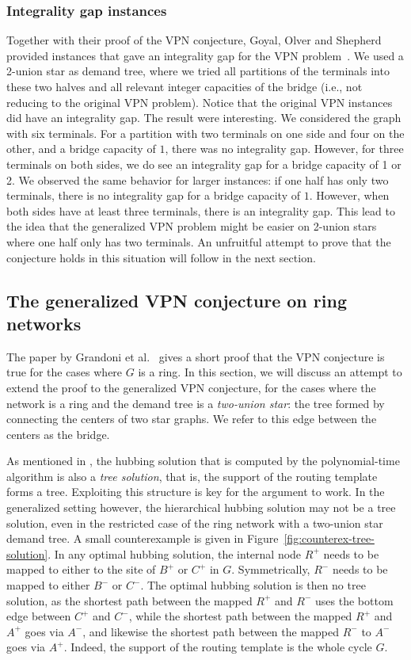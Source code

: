 \subsubsection{Integrality gap instances}
Together with their proof of the VPN conjecture, Goyal, Olver and Shepherd provided instances that gave an integrality gap for the VPN problem~\cite{goyal2013vpn}.
We used a 2-union star as demand tree, where we tried all partitions of the terminals into these two halves and all relevant integer capacities of the bridge (i.e., not reducing to the original VPN problem).
Notice that the original VPN instances did have an integrality gap.
The result were interesting.
We considered the graph with six terminals.
For a partition with two terminals on one side and four on the other, and a bridge capacity of $1$, there was no integrality gap.
However, for three terminals on both sides, we do see an integrality gap for a bridge capacity of 1 or 2.
We observed the same behavior for larger instances: if one half has only two terminals, there is no integrality gap for a bridge capacity of $1$.
However, when both sides have at least three terminals, there is an integrality gap.
This lead to the idea that the generalized VPN problem might be easier on 2-union stars where one half only has two terminals.
An unfruitful attempt to prove that the conjecture holds in this situation will follow in the next section.

\subsection{The generalized VPN conjecture on ring networks} \label{subsec:genvpn:rings}
The paper by Grandoni et al.~\cite{grandoni2008short} gives a short proof that the VPN conjecture is true for the cases where $G$ is a ring.
In this section, we will discuss an attempt to extend the proof to the generalized VPN conjecture, for the cases where the network is a ring and the demand tree is a \emph{two-union star}: the tree formed by connecting the centers of two star graphs.
We refer to this edge between the centers as the bridge.

As mentioned in \cite{grandoni2008short}, the hubbing solution that is computed by the polynomial-time algorithm is also a \emph{tree solution}, that is, the support of the routing template forms a tree.
Exploiting this structure is key for the argument to work.
In the generalized setting however, the hierarchical hubbing solution may not be a tree solution, even in the restricted case of the ring network with a two-union star demand tree.
A small counterexample is given in Figure~\ref{fig:counterex-tree-solution}.
In any optimal hubbing solution, the internal node $R^+$ needs to be mapped to either to the site of $B^+$ or $C^+$ in $G$.
Symmetrically, $R^-$ needs to be mapped to either $B^-$ or $C^-$.
The optimal hubbing solution is then no tree solution, as the shortest path between the mapped $R^+$ and $R^-$ uses the bottom edge between $C^+$ and $C^-$, while the shortest path between the mapped $R^+$ and $A^+$ goes via $A^-$, and likewise the shortest path between the mapped $R^-$ to $A^-$ goes via $A^+$.
Indeed, the support of the routing template is the whole cycle $G$.

